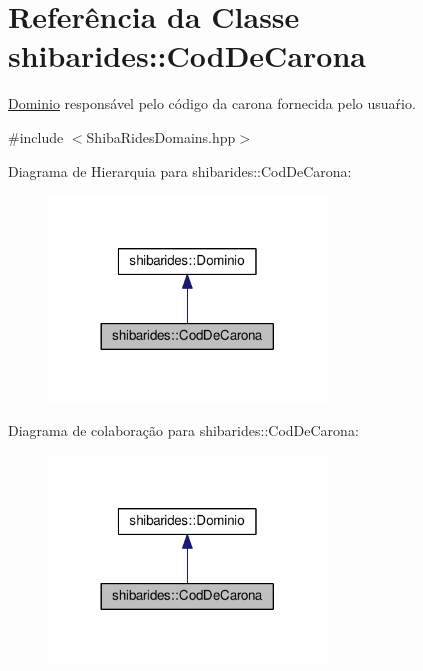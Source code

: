 \hypertarget{classshibarides_1_1CodDeCarona}{}\section{Referência da Classe shibarides\+:\+:Cod\+De\+Carona}
\label{classshibarides_1_1CodDeCarona}


\hyperlink{classshibarides_1_1Dominio}{Dominio} responsável pelo código da carona fornecida pelo usuaŕio.  




{\ttfamily \#include $<$Shiba\+Rides\+Domains.\+hpp$>$}



Diagrama de Hierarquia para shibarides\+:\+:Cod\+De\+Carona\+:\nopagebreak
\begin{figure}[H]
\begin{center}
\leavevmode
\includegraphics[width=209pt]{classshibarides_1_1CodDeCarona__inherit__graph}
\end{center}
\end{figure}


Diagrama de colaboração para shibarides\+:\+:Cod\+De\+Carona\+:\nopagebreak
\begin{figure}[H]
\begin{center}
\leavevmode
\includegraphics[width=209pt]{classshibarides_1_1CodDeCarona__coll__graph}
\end{center}
\end{figure}
